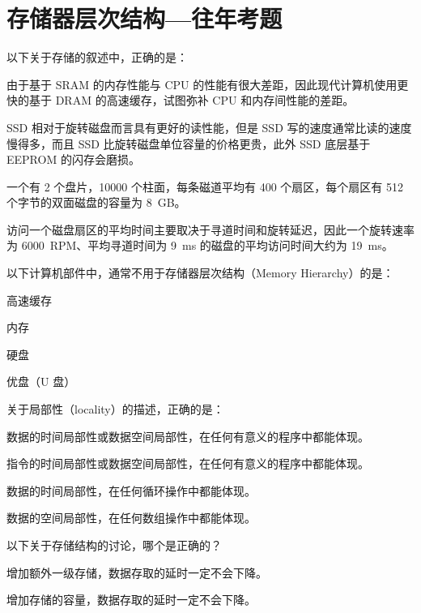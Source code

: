 \chapter{存储器层次结构{---}往年考题}\thispagestyle{empty}
    \begin{problems}
         以下关于存储的叙述中，正确的是：
        \begin{choices}
            \item 由于基于 SRAM 的内存性能与 CPU 的性能有很大差距，因此现代计算机使用更快的基于 DRAM 的高速缓存，试图弥补 CPU 和内存间性能的差距。
            \item SSD 相对于旋转磁盘而言具有更好的读性能，但是 SSD 写的速度通常比读的速度慢得多，而且 SSD 比旋转磁盘单位容量的价格更贵，此外 SSD 底层基于 EEPROM 的闪存会磨损。
            \item 一个有 2 个盘片，10000 个柱面，每条磁道平均有 400 个扇区，每个扇区有 512 个字节的双面磁盘的容量为 \SI{8}{GB}。
            \item 访问一个磁盘扇区的平均时间主要取决于寻道时间和旋转延迟，因此一个旋转速率为 \SI{6000}{RPM}、平均寻道时间为 \SI{9}{ms} 的磁盘的平均访问时间大约为 \SI{19}{ms}。
        \end{choices}
         以下计算机部件中，通常不用于存储器层次结构（Memory Hierarchy）的是：
        \begin{choices}
            \item 高速缓存
            \item 内存
            \item 硬盘
            \item 优盘（U 盘）
        \end{choices}
         关于局部性（locality）的描述，正确的是：
        \begin{choices}
            \item 数据的时间局部性或数据空间局部性，在任何有意义的程序中都能体现。
            \item 指令的时间局部性或数据空间局部性，在任何有意义的程序中都能体现。
            \item 数据的时间局部性，在任何循环操作中都能体现。
            \item 数据的空间局部性，在任何数组操作中都能体现。
        \end{choices}
         以下关于存储结构的讨论，哪个是正确的？
        \begin{choices}
            \item 增加额外一级存储，数据存取的延时一定不会下降。
            \item 增加存储的容量，数据存取的延时一定不会下降。

\end{choices}
\end{problems}
